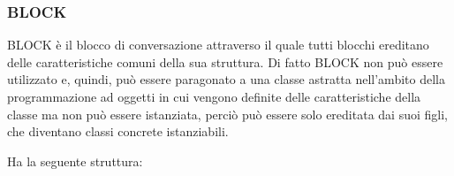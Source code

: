 \subsubsection{BLOCK}

BLOCK è il blocco di conversazione attraverso il quale tutti blocchi ereditano delle caratteristiche comuni della sua struttura. Di fatto BLOCK non può essere utilizzato e, quindi, può essere paragonato a una classe astratta nell’ambito della programmazione ad oggetti in cui vengono definite delle caratteristiche della classe ma non può essere istanziata, perciò può essere solo ereditata dai suoi figli, che diventano classi concrete istanziabili.


Ha la seguente struttura:

